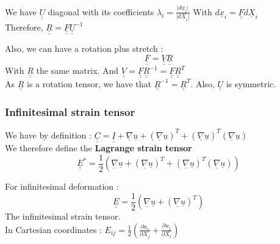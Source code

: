 \documentclass[../main.tex]{subfiles}
\begin{document}
We have $\underline{\underline{U}}$ diagonal with its coefficients $\lambda_i = \frac{\lvert d\underline{x}_i\rvert}{\lvert d\underline{X}_i\rvert}$ With $d\underline{x}_i =\underline{\underline{F}} d\underline{X}_i $\\

Therefore, $\underline{\underline{R}} = \underline{\underline{F}}\underline{\underline{U}}^{-1}$


Also, we can have a rotation plus stretch :\\
\begin{equation}
    \underline{\underline{F}} = \underline{\underline{V}} \underline{\underline{R}}
\end{equation}
With $\underline{\underline{R}}$ the same matrix. And $\underline{\underline{V}} = \underline{\underline{F}} \underline{\underline{R}}^{-1} = \underline{\underline{F}} \underline{\underline{R}}^T$\\

\warning As $\underline{\underline{R}}$ is a rotation tensor, we have that $\underline{\underline{R}}^{-1} = \underline{\underline{R}}^T$. Also, $\underline{\underline{U}}$ is symmetric.\\

\subsubsection{Infinitesimal strain tensor}
We have by definition : $\underline{\underline{C}} = \underline{\underline{I}} + \underline{\nabla}\underline{u} + (\underline{\nabla}\underline{u})^T+ (\underline{\nabla} \underline{u})^T(\underline{\nabla} \underline{u})$\\
We therefore define the \textbf{Lagrange strain tensor } \begin{equation}
    \underline{\underline{E}}^* = \frac{1}{2} (\underline{\nabla}\underline{u} + (\underline{\nabla}\underline{u})^T+ (\underline{\nabla} \underline{u})^T(\underline{\nabla} \underline{u}))
\end{equation}

For infinitesimal deformation : \begin{equation}
    \underline{\underline{E}} = \frac{1}{2}(\underline{\nabla} \underline{u} + (\underline{\nabla} \underline{u})^T)
\end{equation}
The infinitesimal strain tensor.\\
In Cartesian coordinates : $E_{ij} = \frac{1}{2}(\frac{\partial u_i}{\partial X_j} + \frac{\partial u_j}{\partial X_i})$\\
\end{document}

